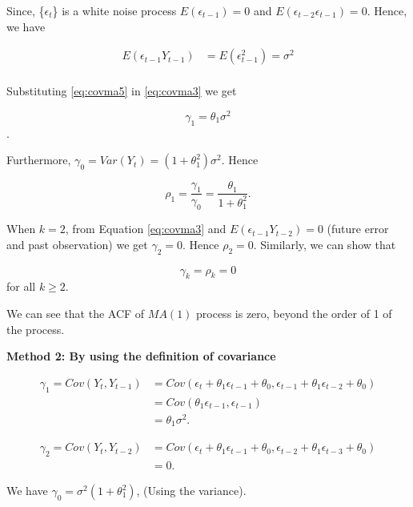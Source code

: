 \documentclass[]{book}
\begin{document}
Since, \{\(\epsilon_t\)\} is a white noise process \(E(\epsilon_{t-1}) = 0\) and \(E(\epsilon_{t-2} \epsilon_{t-1}) = 0\). Hence, we have

\begin{equation}
  \label{eq:covma5}
\begin{aligned}
E(\epsilon_{t-1}Y_{t-1}) &= E(\epsilon_{t-1}^2)=\sigma^2\\
\end{aligned}
\end{equation}

Substituting \eqref{eq:covma5} in \eqref{eq:covma3} we get

\[\gamma_1=\theta_1\sigma^2\].

Furthermore, \(\gamma_0 = Var(Y_t)= (1+\theta_1^2)\sigma^2\). Hence

\[\rho_1=\frac{\gamma_1}{\gamma_0}=\frac{\theta_1}{1+\theta_1^2}.\]

When \(k=2\), from Equation \eqref{eq:covma3} and \(E(\epsilon_{t-1}Y_{t-2}) = 0\) (future error and past observation) we get \(\gamma_2=0\). Hence \(\rho_2=0\). Similarly, we can show that

\[\gamma_k = \rho_k=0\] for all \(k \geq 2\).

We can see that the ACF of \(MA(1)\) process is zero, beyond the order of 1 of the process.

\textbf{Method 2: By using the definition of covariance}

\begin{equation}
  \label{eq:mtd21}
\begin{aligned}
\gamma_1 = Cov(Y_t, Y_{t-1}) &= Cov(\epsilon_t + \theta_1 \epsilon_{t-1}+ \theta_0, \epsilon_{t-1}+\theta_1 \epsilon_{t-2} + \theta_0)\\
&=Cov(\theta_1 \epsilon_{t-1}, \epsilon_{t-1})\\
&=\theta_1 \sigma^2.
\end{aligned}
\end{equation}

\begin{equation}
  \label{eq:mtd21}
\begin{aligned}
\gamma_2=Cov(Y_t, Y_{t-2}) &= Cov(\epsilon_t + \theta_1 \epsilon_{t-1}+ \theta_0, \epsilon_{t-2}+\theta_1 \epsilon_{t-3} + \theta_0)\\
&=0.
\end{aligned}
\end{equation}

We have \(\gamma_0=\sigma^2(1+\theta_1^2)\), (Using the variance).
\end{document}
